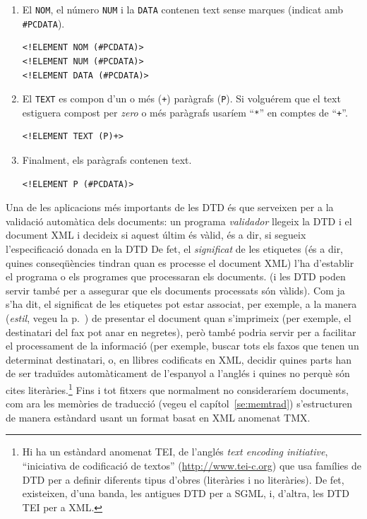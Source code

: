 \begin{enumerate}
\begin{small}
\begin{verbatim}
\end{verbatim}\end{small}
\item El \texttt{NOM}, el número \texttt{NUM} i la \texttt{DATA}
  contenen text sense marques (indicat amb \verb+#PCDATA+).
\begin{small}\begin{verbatim}
<!ELEMENT NOM (#PCDATA)>
<!ELEMENT NUM (#PCDATA)>
<!ELEMENT DATA (#PCDATA)>
\end{verbatim}\end{small}
\item El \texttt{TEXT} es compon d'un o més (\texttt{+}) paràgrafs
  (\texttt{P}). Si volguérem que el text estiguera compost per \emph{zero} o
  més paràgrafs usaríem ``\texttt{*}'' en comptes de ``\texttt{+}''.
\begin{small}\begin{verbatim}
<!ELEMENT TEXT (P)+>
\end{verbatim}\end{small}
\item Finalment, els paràgrafs contenen text.
\begin{small}\begin{verbatim}
<!ELEMENT P (#PCDATA)>
\end{verbatim}\end{small}
\end{enumerate}
Una de les aplicacions més importants de les DTD és que serveixen per a la
validació automàtica dels documents: un programa \emph{validador} llegeix la
DTD i el document XML i decideix si aquest últim és vàlid, és a dir, si segueix
l'especificació donada en la DTD
De fet, el \emph{significat} de les etiquetes (és
a dir, quines conseqüències tindran quan es processe el document XML) l'ha
d'establir el programa o els programes que processaran els documents. 
(i les DTD poden servir també per a assegurar que els documents processats són vàlids).
Com ja
s'ha dit, el significat de les etiquetes pot estar associat, per exemple, a la
manera (\emph{estil}, vegeu la p.~\pageref{pg:estil}) de presentar el document
quan s'imprimeix (per exemple, el destinatari del fax pot anar en negretes),
però també podria servir per a facilitar el processament de la informació (per
exemple, buscar tots els faxos que tenen un determinat destinatari, o, en
llibres codificats en XML, decidir quines parts han de ser traduïdes
automàticament de l'espanyol a l'anglés i quines no perquè són cites
literàries.\footnote{Hi ha un estàndard anomenat TEI, de l'anglés \emph{text encoding initiative}, ``iniciativa de codificació de textos'' (\url{http://www.tei-c.org}) que usa famílies de DTD per a definir diferents tipus d'obres (literàries i no literàries). De fet, existeixen, d'una banda, les antigues DTD  per a SGML, i, d'altra, les DTD TEI per a XML.}
   Fins i tot fitxers que normalment no
consideraríem documents, com ara les memòries de traducció (vegeu el
capítol~\ref{se:memtrad}) s'estructuren de manera estàndard usant un format
basat en XML anomenat TMX.  


